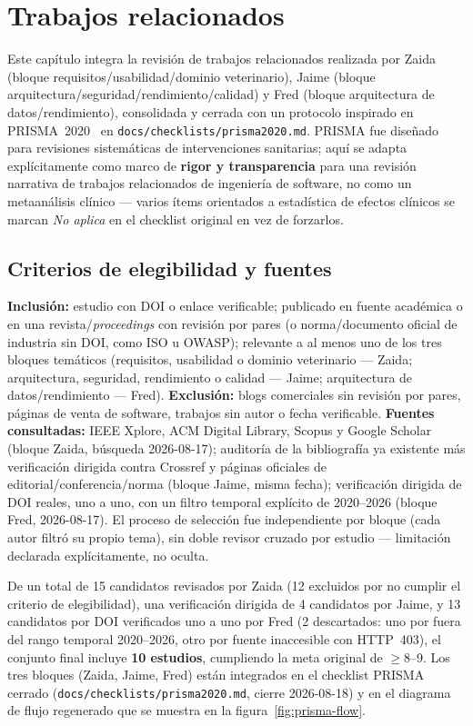 \chapter{Trabajos relacionados}
\label{cap:trabajos-relacionados}

Este cap\'itulo integra la revisi\'on de trabajos relacionados realizada por
Zaida (bloque requisitos/usabilidad/dominio veterinario), Jaime (bloque
arquitectura/seguridad/rendimiento/calidad) y Fred (bloque arquitectura de
datos/rendimiento), consolidada y cerrada con un protocolo inspirado en
PRISMA~2020~\cite{page2021prisma} en \texttt{docs/checklists/prisma2020.md}.
PRISMA fue dise\~nado para revisiones sistem\'aticas de intervenciones
sanitarias; aqu\'i se adapta expl\'icitamente como marco de \textbf{rigor y
transparencia} para una revisi\'on narrativa de trabajos relacionados de
ingenier\'ia de software, no como un metaan\'alisis cl\'inico --- varios
\'items orientados a estad\'istica de efectos cl\'inicos se marcan
\emph{No aplica} en el checklist original en vez de forzarlos.

\section{Criterios de elegibilidad y fuentes}

\textbf{Inclusi\'on:} estudio con DOI o enlace verificable; publicado en
fuente acad\'emica o en una revista/\emph{proceedings} con revisi\'on por
pares (o norma/documento oficial de industria sin DOI, como ISO u OWASP);
relevante a al menos uno de los tres bloques tem\'aticos (requisitos,
usabilidad o dominio veterinario --- Zaida; arquitectura, seguridad,
rendimiento o calidad --- Jaime; arquitectura de datos/rendimiento ---
Fred). \textbf{Exclusi\'on:} blogs comerciales sin revisi\'on por pares,
p\'aginas de venta de software, trabajos sin autor o fecha verificable.
\textbf{Fuentes consultadas:} IEEE Xplore, ACM Digital Library, Scopus y
Google Scholar (bloque Zaida, b\'usqueda 2026-08-17); auditor\'ia de la
bibliograf\'ia ya existente m\'as verificaci\'on dirigida contra Crossref y
p\'aginas oficiales de editorial/conferencia/norma (bloque Jaime, misma
fecha); verificaci\'on dirigida de DOI reales, uno a uno, con un filtro
temporal expl\'icito de 2020--2026 (bloque Fred, 2026-08-17). El proceso de
selecci\'on fue independiente por bloque (cada autor filtr\'o su propio
tema), sin doble revisor cruzado por estudio --- limitaci\'on declarada
expl\'icitamente, no oculta.

De un total de 15 candidatos revisados por Zaida (12 excluidos por no
cumplir el criterio de elegibilidad), una verificaci\'on dirigida de 4
candidatos por Jaime, y 13 candidatos por DOI verificados uno a uno por
Fred (2 descartados: uno por fuera del rango temporal 2020--2026, otro por
fuente inaccesible con HTTP~403), el conjunto final incluye \textbf{10
estudios}, cumpliendo la meta original de $\geq$8--9. Los tres bloques
(Zaida, Jaime, Fred) est\'an integrados en el checklist PRISMA cerrado
(\texttt{docs/checklists/prisma2020.md}, cierre 2026-08-18) y en el
diagrama de flujo regenerado que se muestra en la
figura~\ref{fig:prisma-flow}.

